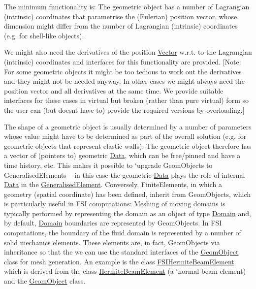 The minimum functionality is\+: The geometric object has a number of Lagrangian (intrinsic) coordinates that parametrise the (Eulerian) position vector, whose dimension might differ from the number of Lagrangian (intrinsic) coordinates (e.\+g. for shell-\/like objects).

We might also need the derivatives of the position \hyperlink{classoomph_1_1Vector}{Vector} w.\+r.\+t. to the Lagrangian (intrinsic) coordinates and interfaces for this functionality are provided. \mbox{[}Note\+: For some geometric objects it might be too tedious to work out the derivatives and they might not be needed anyway. In other cases we might always need the position vector and all derivatives at the same time. We provide suitable interfaces for these cases in virtual but broken (rather than pure virtual) form so the user can (but doesn\textquotesingle{}t have to) provide the required versions by overloading.\mbox{]}

The shape of a geometric object is usually determined by a number of parameters whose value might have to be determined as part of the overall solution (e.\+g. for geometric objects that represent elastic walls). The geometric object therefore has a vector of (pointers to) geometric \hyperlink{classoomph_1_1Data}{Data}, which can be free/pinned and have a time history, etc. This makes it possible to `upgrade\textquotesingle{} Geom\+Objects to Generalised\+Elements -- in this case the geometric \hyperlink{classoomph_1_1Data}{Data} plays the role of internal \hyperlink{classoomph_1_1Data}{Data} in the \hyperlink{classoomph_1_1GeneralisedElement}{Generalised\+Element}. Conversely, Finite\+Elements, in which a geometry (spatial coordinate) has been defined, inherit from Geom\+Objects, which is particularly useful in F\+SI computations\+: Meshing of moving domains is typically performed by representing the domain as an object of type \hyperlink{classoomph_1_1Domain}{Domain} and, by default, \hyperlink{classoomph_1_1Domain}{Domain} boundaries are represented by Geom\+Objects. In F\+SI computations, the boundary of the fluid domain is represented by a number of solid mechanics elements. These elements are, in fact, Geom\+Objects via inheritance so that the we can use the standard interfaces of the \hyperlink{classoomph_1_1GeomObject}{Geom\+Object} class for mesh generation. An example is the class {\ttfamily \hyperlink{classoomph_1_1FSIHermiteBeamElement}{F\+S\+I\+Hermite\+Beam\+Element}} which is derived from the class {\ttfamily \hyperlink{classoomph_1_1HermiteBeamElement}{Hermite\+Beam\+Element}} (a `normal\textquotesingle{} beam element) and the {\ttfamily \hyperlink{classoomph_1_1GeomObject}{Geom\+Object}} class.


